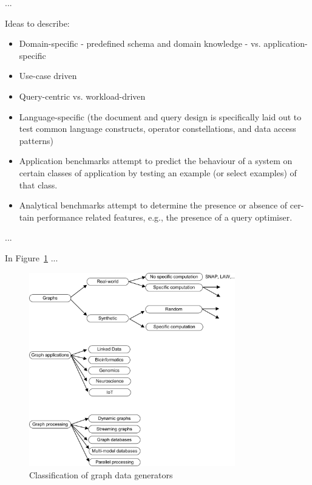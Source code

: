 ...



Ideas to describe:

\begin{itemize}
  \item Domain-specific - predefined schema and domain knowledge - vs. application-specific~\cite{Tay2011}
  \item Use-case driven
  \item Query-centric vs. workload-driven~\cite{gMark}
  \item Language-specific (the document and query design is specifically laid out to test common language constructs, operator constellations, and data access patterns)~\cite{Schmidt2010}
  \item Application benchmarks attempt to predict the behaviour of a system on
certain classes of application by testing an example (or select examples) of that
class.
  \item Analytical benchmarks attempt to determine the presence or absence of cer-
tain performance related features, e.g., the presence of a query optimiser.
\end{itemize}

...

In Figure~\ref{fig:classification} ...

\begin{figure}
\centering
\includegraphics[width=0.8\textwidth]{classification.png}
\caption{Classification of graph data generators}
\label{fig:classification}
\end{figure}
